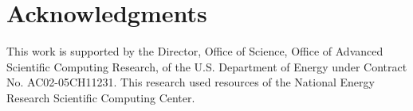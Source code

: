 \documentclass[12pt]{article}
\begin{document}
\section*{Acknowledgments}

This work is supported by the Director, Office of Science, Office of Advanced Scientific Computing Research, of the U.S. Department of Energy under Contract No. AC02-05CH11231. This research used resources of the National Energy Research Scientific Computing Center.

\newpage



\end{document}
